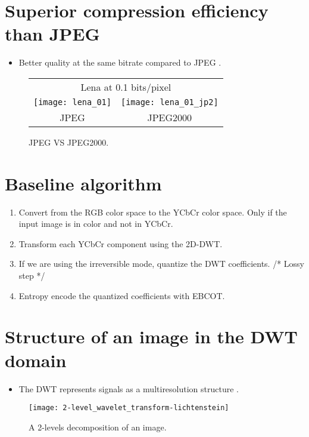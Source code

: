 \section{Superior compression efficiency than \gls{JPEG}}
\begin{itemize}
\item Better quality at the same bitrate compared to JPEG \cite{vruiz_J2K}.
\end{itemize}

\begin{figure}[H]
  \vspace{-2ex}
  \centering
  \begin{tabular}{cc}
    \multicolumn{2}{c}{Lena at 0.1 bits/pixel} \\
    \texttt{[image: lena\_01]} & \texttt{[image: lena\_01\_jp2]} \\
    JPEG & JPEG2000
  \end{tabular}
  \caption{\gls{JPEG} VS JPEG2000.}
  \label{fig:J2K_JPEG}
\end{figure}

\section{Baseline algorithm}
\begin{enumerate}
\item Convert from the \gls{RGB} color space to the \gls{YCbCr} color
  space. Only if the input image is in color and not in \gls{YCbCr}.
\item Transform each \gls{YCbCr} component using the 2D-\gls{DWT}.
\item If we are using the irreversible mode, quantize the \gls{DWT}
  coefficients. /* Lossy step */
\item Entropy encode the quantized coefficients with \gls{EBCOT}.
\end{enumerate}

\section{Structure of an image in the DWT domain}
\begin{itemize}
\item The \gls{DWT} represents signals as a multiresolution structure
  \cite{vruiz_J2K}.
\end{itemize}

\begin{figure}[H]
  \vspace{-2ex}
  \centering
  \texttt{[image: 2-level\_wavelet\_transform-lichtenstein]}
  \caption{A 2-levels decomposition of an image.}
  \label{fig:J2K_DWT}
\end{figure}

